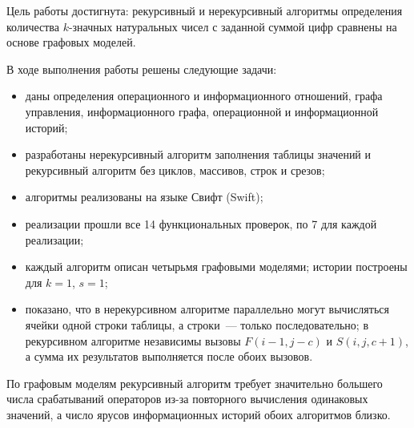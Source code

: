 
Цель работы достигнута: рекурсивный и нерекурсивный алгоритмы определения
количества $k$-значных натуральных чисел с заданной суммой цифр сравнены
на основе графовых моделей.

В ходе выполнения работы решены следующие задачи:
\begin{itemize}
    \item даны определения операционного и информационного отношений, графа
    управления, информационного графа, операционной и информационной историй;
    \item разработаны нерекурсивный алгоритм заполнения таблицы значений
    и рекурсивный алгоритм без циклов, массивов, строк и срезов;
    \item алгоритмы реализованы на языке Свифт (Swift);
    \item реализации прошли все 14 функциональных проверок, по 7 для каждой
    реализации;
    \item каждый алгоритм описан четырьмя графовыми моделями; истории построены
    для $k=1$, $s=1$;
    \item показано, что в нерекурсивном алгоритме параллельно могут вычисляться
    ячейки одной строки таблицы, а строки~--- только последовательно;
    в рекурсивном алгоритме независимы вызовы $F(i-1,j-c)$ и $S(i,j,c+1)$,
    а сумма их результатов выполняется после обоих вызовов.
\end{itemize}

По графовым моделям рекурсивный алгоритм требует значительно большего числа
срабатываний операторов из-за повторного вычисления одинаковых значений,
а число ярусов информационных историй обоих алгоритмов близко.
